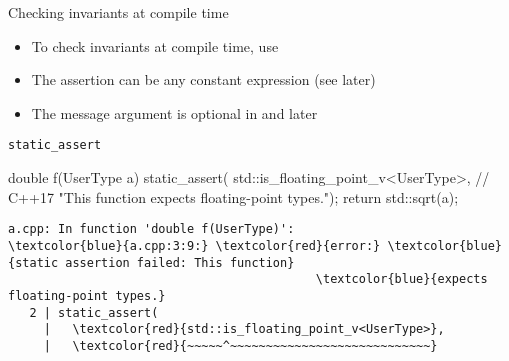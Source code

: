 \begin{frame}[fragile]
  \begin{block}{Checking invariants at compile time}
    \begin{itemize}
      \item To check invariants at compile time, use 
      \item The assertion can be any constant expression (see later)
      \item The message argument is optional in  and later
    \end{itemize}
  \end{block}
  \begin{exampleblock}{\texttt{static\_assert}}
    \small
    \begin{cppcode*}{}
      double f(UserType a) {
        static_assert(
          std::is_floating_point_v<UserType>, // C++17
          "This function expects floating-point types.");
        return std::sqrt(a);
      }
    \end{cppcode*}
  \end{exampleblock}
  \scriptsize
  \begin{Verbatim}[commandchars=\\\{\}]
a.cpp: In function 'double f(UserType)':
\textcolor{blue}{a.cpp:3:9:} \textcolor{red}{error:} \textcolor{blue}{static assertion failed: This function}
                                           \textcolor{blue}{expects floating-point types.}
   2 | static_assert(
     |   \textcolor{red}{std::is_floating_point_v<UserType>},
     |   \textcolor{red}{~~~~~^~~~~~~~~~~~~~~~~~~~~~~~~~~~~}
  \end{Verbatim}
\end{frame}
